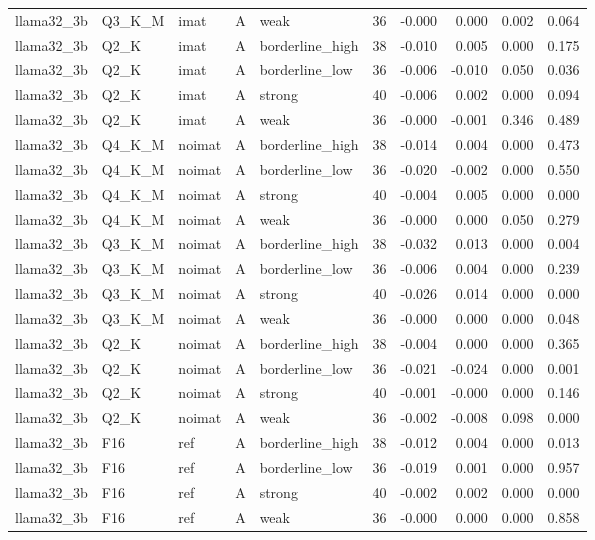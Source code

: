 \begin{tabular}{lllllrrrrr}
llama32\_3b & Q3\_K\_M & imat & A & weak & 36 & -0.000 & 0.000 & 0.002 & 0.064 \\
llama32\_3b & Q2\_K & imat & A & borderline\_high & 38 & -0.010 & 0.005 & 0.000 & 0.175 \\
llama32\_3b & Q2\_K & imat & A & borderline\_low & 36 & -0.006 & -0.010 & 0.050 & 0.036 \\
llama32\_3b & Q2\_K & imat & A & strong & 40 & -0.006 & 0.002 & 0.000 & 0.094 \\
llama32\_3b & Q2\_K & imat & A & weak & 36 & -0.000 & -0.001 & 0.346 & 0.489 \\
llama32\_3b & Q4\_K\_M & noimat & A & borderline\_high & 38 & -0.014 & 0.004 & 0.000 & 0.473 \\
llama32\_3b & Q4\_K\_M & noimat & A & borderline\_low & 36 & -0.020 & -0.002 & 0.000 & 0.550 \\
llama32\_3b & Q4\_K\_M & noimat & A & strong & 40 & -0.004 & 0.005 & 0.000 & 0.000 \\
llama32\_3b & Q4\_K\_M & noimat & A & weak & 36 & -0.000 & 0.000 & 0.050 & 0.279 \\
llama32\_3b & Q3\_K\_M & noimat & A & borderline\_high & 38 & -0.032 & 0.013 & 0.000 & 0.004 \\
llama32\_3b & Q3\_K\_M & noimat & A & borderline\_low & 36 & -0.006 & 0.004 & 0.000 & 0.239 \\
llama32\_3b & Q3\_K\_M & noimat & A & strong & 40 & -0.026 & 0.014 & 0.000 & 0.000 \\
llama32\_3b & Q3\_K\_M & noimat & A & weak & 36 & -0.000 & 0.000 & 0.000 & 0.048 \\
llama32\_3b & Q2\_K & noimat & A & borderline\_high & 38 & -0.004 & 0.000 & 0.000 & 0.365 \\
llama32\_3b & Q2\_K & noimat & A & borderline\_low & 36 & -0.021 & -0.024 & 0.000 & 0.001 \\
llama32\_3b & Q2\_K & noimat & A & strong & 40 & -0.001 & -0.000 & 0.000 & 0.146 \\
llama32\_3b & Q2\_K & noimat & A & weak & 36 & -0.002 & -0.008 & 0.098 & 0.000 \\
llama32\_3b & F16 & ref & A & borderline\_high & 38 & -0.012 & 0.004 & 0.000 & 0.013 \\
llama32\_3b & F16 & ref & A & borderline\_low & 36 & -0.019 & 0.001 & 0.000 & 0.957 \\
llama32\_3b & F16 & ref & A & strong & 40 & -0.002 & 0.002 & 0.000 & 0.000 \\
llama32\_3b & F16 & ref & A & weak & 36 & -0.000 & 0.000 & 0.000 & 0.858 \\

\end{tabular}
